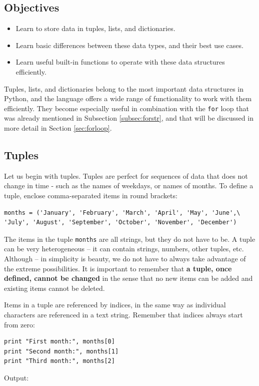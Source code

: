 \subsection{Objectives}

\begin{itemize}
\item Learn to store data in tuples, lists, and dictionaries.
\item Learn basic differences between these data types, and their best use cases.
\item Learn useful built-in functions to operate with these data structures efficiently. 
\end{itemize}
Tuples, lists, and dictionaries belong to the most important data structures in Python, and the 
language offers a wide range of functionality to work with them efficiently. They become 
especially useful in combination with the {\tt for}
loop that was already mentioned in Subsection \ref{subsec:forstr}, and that will be 
discussed in more detail in Section \ref{sec:forloop}. 

\subsection{Tuples}

Let us begin with tuples. Tuples are perfect for sequences 
of data that does not change in time - such as 
the names of weekdays, or names of months. To define a tuple, 
enclose comma-separated items in round brackets:

\begin{verbatim}
months = ('January', 'February', 'March', 'April', 'May', 'June',\
'July', 'August', 'September', 'October', 'November', 'December')
\end{verbatim}
The items in the tuple {\tt months} are all strings, but they do not
have to be. A tuple can be very heterogeneous -- it can contain strings,
numbers, other tuples, etc. Although -- in simplicity is beauty, we
do not have to always take advantage of the extreme possibilities.
It is important to remember that {\bf a tuple, once defined, cannot 
be changed} in the sense that no new items can be added and existing 
items cannot be deleted.

Items in a tuple are referenced by indices, in the same way as individual 
characters are referenced in a text string. Remember that indices always 
start from zero:

\begin{verbatim}
print "First month:", months[0]
print "Second month:", months[1]
print "Third month:", months[2]
\end{verbatim}
Output:

